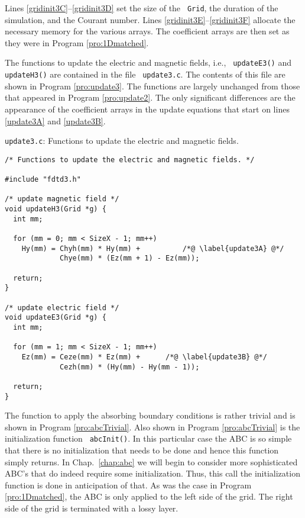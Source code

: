 Lines \ref{gridinit3C}--\ref{gridinit3D} set the size of the {\tt
  Grid}, the duration of the simulation, and the Courant number.
Lines \ref{gridinit3E}--\ref{gridinit3F} allocate the necessary memory
for the various arrays.  The coefficient arrays are then set as they
were in Program \ref{pro:1Dmatched}.

The functions to update the electric and magnetic fields, i.e., {\tt
  updateE3()} and {\tt updateH3()} are contained in the file {\tt
  update3.c}.  The contents of this file are shown in Program
\ref{pro:update3}.  The functions are largely unchanged from those
that appeared in Program \ref{pro:update2}.  The only significant
differences are the appearance of the coefficient arrays in the update
equations that start on lines \ref{update3A} and \ref{update3B}.
\begin{program}
{\tt update3.c}: Functions to update the electric and magnetic fields.
\label{pro:update3}
\codemiddle
\begin{lstlisting}
/* Functions to update the electric and magnetic fields. */

#include "fdtd3.h"

/* update magnetic field */
void updateH3(Grid *g) {
  int mm;

  for (mm = 0; mm < SizeX - 1; mm++)
    Hy(mm) = Chyh(mm) * Hy(mm) +          /*@ \label{update3A} @*/
             Chye(mm) * (Ez(mm + 1) - Ez(mm));

  return;
}

/* update electric field */
void updateE3(Grid *g) {
  int mm;

  for (mm = 1; mm < SizeX - 1; mm++)
    Ez(mm) = Ceze(mm) * Ez(mm) +      /*@ \label{update3B} @*/
             Cezh(mm) * (Hy(mm) - Hy(mm - 1));

  return;
}
\end{lstlisting}
\end{program}

The function to apply the absorbing boundary conditions is rather
trivial and is shown in Program \ref{pro:abcTrivial}.  Also shown in
Program \ref{pro:abcTrivial} is the initialization function {\tt
  abcInit()}.  In this particular case the ABC is so simple that there
is no initialization that needs to be done and hence this function
simply returns.  In Chap.\ \ref{chap:abc} we will begin to consider more
sophisticated ABC's that do indeed require some initialization.  Thus,
this call the initialization function is done in anticipation of that.
As was the case in Program \ref{pro:1Dmatched}, the ABC is only
applied to the left side of the grid.  The right side of the grid is
terminated with a lossy layer.

